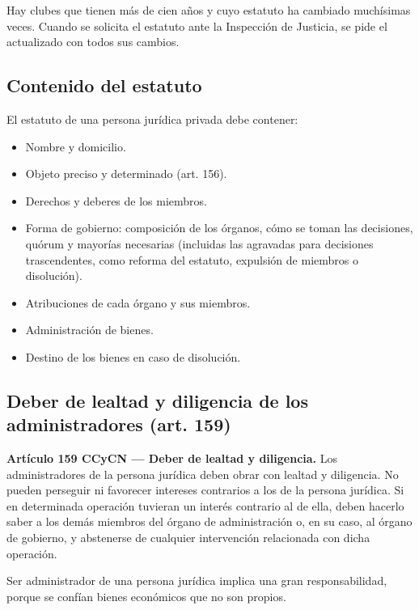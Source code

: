 \documentclass[12pt,oneside]{book}
\begin{document}
\begin{note}
Hay clubes que tienen más de cien años y cuyo estatuto ha cambiado muchísimas veces. Cuando se solicita el estatuto ante la Inspección de Justicia, se pide el actualizado con todos sus cambios.
\end{note}

\subsection{Contenido del estatuto}

El estatuto de una persona jurídica privada debe contener:

\begin{itemize}
    \item Nombre y domicilio.
    \item Objeto preciso y determinado (art. 156).
    \item Derechos y deberes de los miembros.
    \item Forma de gobierno: composición de los órganos, cómo se toman las decisiones, quórum y mayorías necesarias (incluidas las agravadas para decisiones trascendentes, como reforma del estatuto, expulsión de miembros o disolución).
    \item Atribuciones de cada órgano y sus miembros.
    \item Administración de bienes.
    \item Destino de los bienes en caso de disolución.
\end{itemize}

\subsection{Deber de lealtad y diligencia de los administradores (art. 159)}

\begin{important}
\textbf{Artículo 159 CCyCN --- Deber de lealtad y diligencia.} Los administradores de la persona jurídica deben obrar con lealtad y diligencia. No pueden perseguir ni favorecer intereses contrarios a los de la persona jurídica. Si en determinada operación tuvieran un interés contrario al de ella, deben hacerlo saber a los demás miembros del órgano de administración o, en su caso, al órgano de gobierno, y abstenerse de cualquier intervención relacionada con dicha operación.
\end{important}

Ser administrador de una persona jurídica implica una gran responsabilidad, porque se confían bienes económicos que no son propios.
\end{document}
